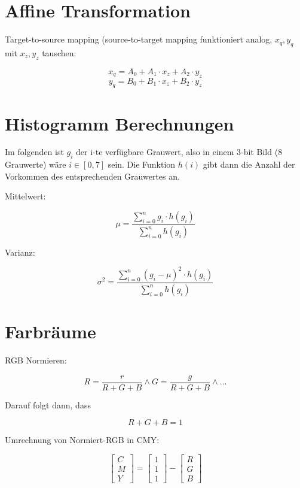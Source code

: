\newpage
\section{Affine Transformation}

Target-to-source mapping (source-to-target mapping funktioniert analog, $x_q, y_q$ mit $x_z, y_z$ tauschen:

\[ x_q = A_0 + A_1 \cdot x_z + A_2 \cdot y_z \]
\[ y_q = B_0 + B_1 \cdot x_z + B_2 \cdot y_z \]




\section{Histogramm Berechnungen}

Im folgenden ist $g_i$ der i-te verfügbare Grauwert, also in einem 3-bit Bild (8 Grauwerte) wäre  $i \in [0, 7]$ sein. Die Funktion $h(i)$ gibt dann die Anzahl der Vorkommen des entsprechenden Grauwertes an.

Mittelwert:

\[
	\mu = \frac{
		\sum_{i=0}^n g_i \cdot h(g_i)
	}
	{
		\sum_{i=0}^n h(g_i)
	}
\]


Varianz:

\[
	\sigma^2 = \frac{
		\sum_{i=0}^n (g_i-\mu)^2 \cdot h(g_i)
	}
	{
		\sum_{i=0}^n h(g_i)
	}
\]





\section{Farbräume}

RGB Normieren:

\[
	R = \frac{r}{R+G+B} \wedge G = \frac{g}{R+G+B} \wedge ...
\]

Darauf folgt dann, dass

\[ R + G + B = 1 \]

Umrechnung von Normiert-RGB in CMY:

\[
	\begin{bmatrix}
		C \\
		M \\
		Y
	\end{bmatrix}
	=
	\begin{bmatrix}
		1 \\
		1 \\
		1
	\end{bmatrix}
	-
	\begin{bmatrix}
		R \\
		G \\
		B
	\end{bmatrix}
\]


